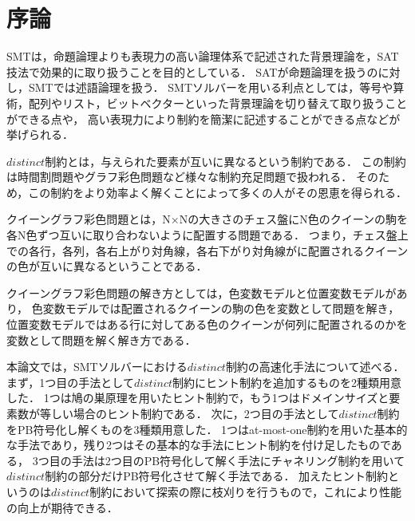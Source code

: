 \chapter{序論}


SMTは，命題論理よりも表現力の高い論理体系で記述された背景理論を，SAT技法で効果的に取り扱うことを目的としている．
SATが命題論理を扱うのに対し，SMTでは述語論理を扱う．
SMTソルバーを用いる利点としては，等号や算術，配列やリスト，ビットベクターといった背景理論を切り替えて取り扱うことができる点や，
高い表現力により制約を簡潔に記述することができる点などが挙げられる．


$distinct$制約とは，与えられた要素が互いに異なるという制約である．
この制約は時間割問題やグラフ彩色問題など様々な制約充足問題で扱われる．
そのため，この制約をより効率よく解くことによって多くの人がその恩恵を得られる．


クイーングラフ彩色問題とは，N×Nの大きさのチェス盤にN色のクイーンの駒を各N色ずつ互いに取り合わないように配置する問題である．
つまり，チェス盤上での各行，各列，各右上がり対角線，各右下がり対角線がに配置されるクイーンの色が互いに異なるということである．

クイーングラフ彩色問題の解き方としては，色変数モデルと位置変数モデルがあり，
色変数モデルでは配置されるクイーンの駒の色を変数として問題を解き，
位置変数モデルではある行に対してある色のクイーンが何列に配置されるのかを変数として問題を解く解き方である．




本論文では，SMTソルバーにおける$distinct$制約の高速化手法について述べる．
まず，1つ目の手法として$distinct$制約にヒント制約を追加するものを2種類用意した．
1つは鳩の巣原理を用いたヒント制約で，もう1つはドメインサイズと要素数が等しい場合のヒント制約である．
次に，2つ目の手法として$distinct$制約をPB符号化し解くものを3種類用意した．
1つはat-most-one制約を用いた基本的な手法であり，残り2つはその基本的な手法にヒント制約を付け足したものである，
3つ目の手法は2つ目のPB符号化して解く手法にチャネリング制約を用いて$distinct$制約の部分だけPB符号化させて解く手法である．
加えたヒント制約というのは$distinct$制約において探索の際に枝刈りを行うもので，これにより性能の向上が期待できる．

